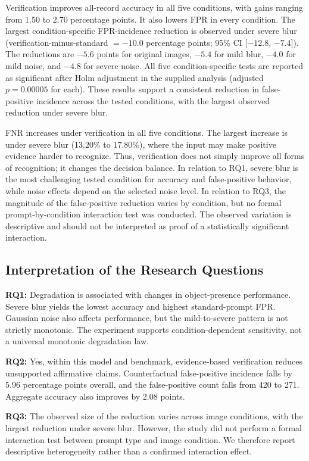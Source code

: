 \documentclass[conference]{IEEEtran}
\begin{document}
Verification improves all-record accuracy in all five conditions, with gains ranging from 1.50 to 2.70 percentage points. It also lowers FPR in every condition. The largest condition-specific FPR-incidence reduction is observed under severe blur (verification-minus-standard $=-10.0$ percentage points; 95\% CI [$-12.8$, $-7.4$]). The reductions are $-5.6$ points for original images, $-5.4$ for mild blur, $-4.0$ for mild noise, and $-4.8$ for severe noise. All five condition-specific tests are reported as significant after Holm adjustment in the supplied analysis (adjusted $p=0.00005$ for each). These results support a consistent reduction in false-positive incidence across the tested conditions, with the largest observed reduction under severe blur.

FNR increases under verification in all five conditions. The largest increase is under severe blur (13.20\% to 17.80\%), where the input may make positive evidence harder to recognize. Thus, verification does not simply improve all forms of recognition; it changes the decision balance. In relation to RQ1, severe blur is the most challenging tested condition for accuracy and false-positive behavior, while noise effects depend on the selected noise level. In relation to RQ3, the magnitude of the false-positive reduction varies by condition, but no formal prompt-by-condition interaction test was conducted. The observed variation is descriptive and should not be interpreted as proof of a statistically significant interaction.

\subsection{Interpretation of the Research Questions}
\textbf{RQ1:} Degradation is associated with changes in object-presence performance. Severe blur yields the lowest accuracy and highest standard-prompt FPR. Gaussian noise also affects performance, but the mild-to-severe pattern is not strictly monotonic. The experiment supports condition-dependent sensitivity, not a universal monotonic degradation law.

\textbf{RQ2:} Yes, within this model and benchmark, evidence-based verification reduces unsupported affirmative claims. Counterfactual false-positive incidence falls by 5.96 percentage points overall, and the false-positive count falls from 420 to 271. Aggregate accuracy also improves by 2.08 points.

\textbf{RQ3:} The observed size of the reduction varies across image conditions, with the largest reduction under severe blur. However, the study did not perform a formal interaction test between prompt type and image condition. We therefore report descriptive heterogeneity rather than a confirmed interaction effect.
\end{document}
